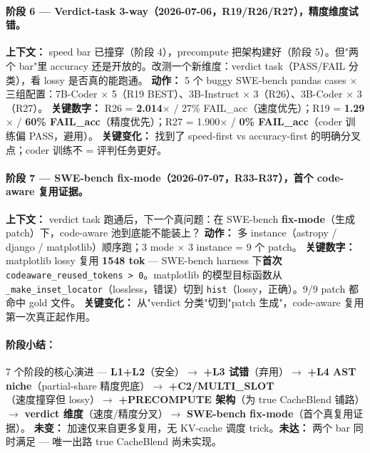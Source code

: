 \documentclass[11pt,a4paper]{article}
\begin{document}
\paragraph{阶段 6 --- Verdict-task 3-way（2026-07-06，R19/R26/R27），精度维度试错。}
\textbf{上下文：} speed bar 已撞穿（阶段 4），precompute 把架构建好（阶段 5）。但"两个 bar"里 accuracy 还是开放的。改测一个新维度：verdict task（PASS/FAIL 分类），看 lossy 是否真的能跑通。
\textbf{动作：} 5 个 buggy SWE-bench pandas cases × 三组配置：7B-Coder × 5（R19 BEST）、3B-Instruct × 3（R26）、3B-Coder × 3（R27）。
\textbf{关键数字：} R26 = \textbf{2.014$\times$} / 27\% FAIL\_acc（速度优先）；R19 = \textbf{1.29$\times$} / \textbf{60\% FAIL\_acc}（精度优先）；R27 = 1.900$\times$ / \textbf{0\% FAIL\_acc}（coder 训练偏 PASS，避用）。
\textbf{关键变化：} 找到了 speed-first vs accuracy-first 的明确分叉点；coder 训练不 = 评判任务更好。

\paragraph{阶段 7 --- SWE-bench fix-mode（2026-07-07，R33-R37），首个 code-aware 复用证据。}
\textbf{上下文：} verdict task 跑通后，下一个真问题：在 SWE-bench \textbf{fix-mode}（生成 patch）下，code-aware 池到底能不能装上？
\textbf{动作：} 多 instance（astropy / django / matplotlib）顺序跑；3 mode × 3 instance = 9 个 patch。
\textbf{关键数字：} matplotlib lossy 复用 \textbf{1548 tok} --- SWE-bench harness 下\textbf{首次} \texttt{codeaware\_reused\_tokens > 0}。matplotlib 的模型目标函数从 \texttt{\_make\_inset\_locator}（lossless，错误）切到 \texttt{hist}（lossy，正确）。9/9 patch 都命中 gold 文件。
\textbf{关键变化：} 从"verdict 分类"切到"patch 生成"，code-aware 复用第一次真正起作用。

\paragraph{阶段小结：} 7 个阶段的核心演进 ---
\textbf{L1+L2}（安全）$\to$ \textbf{+L3 试错}（弃用）$\to$ \textbf{+L4 AST niche}（partial-share 精度兜底）$\to$ \textbf{+C2/MULTI\_SLOT}（速度撞穿但 lossy）$\to$ \textbf{+PRECOMPUTE 架构}（为 true CacheBlend 铺路）$\to$ \textbf{verdict 维度}（速度/精度分叉）$\to$ \textbf{SWE-bench fix-mode}（首个真复用证据）。
\textbf{未变：} 加速仅来自更多复用，无 KV-cache 调度 trick。\textbf{未达：} 两个 bar 同时满足 --- 唯一出路 true CacheBlend 尚未实现。

\end{document}
